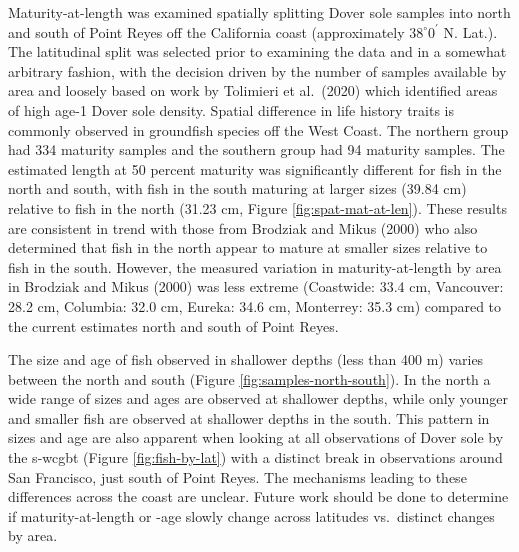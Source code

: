 \documentclass[11pt,
  english,
  a4paper,
]{article}
\begin{document}

Maturity-at-length was examined spatially splitting Dover sole samples into north and south of Point Reyes off the California coast (approximately {\(38^\circ 0^\prime\)\leavevmode\tagmcend\tagstructend} N. Lat.). The latitudinal split was selected prior to examining the data and in a somewhat arbitrary fashion, with the decision driven by the number of samples available by area and loosely based on work by Tolimieri et al.~{(2020)\leavevmode\tagmcend\tagstructend} which identified areas of high age-1 Dover sole density. Spatial difference in life history traits is commonly observed in groundfish species off the West Coast. The northern group had 334 maturity samples and the southern group had 94 maturity samples. The estimated length at 50 percent maturity was significantly different for fish in the north and south, with fish in the south maturing at larger sizes (39.84 cm) relative to fish in the north (31.23 cm, Figure \ref{fig:spat-mat-at-len}). These results are consistent in trend with those from Brodziak and Mikus {(2000)\leavevmode\tagmcend\tagstructend} who also determined that fish in the north appear to mature at smaller sizes relative to fish in the south. However, the measured variation in maturity-at-length by area in Brodziak and Mikus {(2000)\leavevmode\tagmcend\tagstructend} was less extreme (Coastwide: 33.4 cm, Vancouver: 28.2 cm, Columbia: 32.0 cm, Eureka: 34.6 cm, Monterrey: 35.3 cm) compared to the current estimates north and south of Point Reyes.

\leavevmode\tagmcend\tagstructend\par


The size and age of fish observed in shallower depths (less than 400 m) varies between the north and south (Figure \ref{fig:samples-north-south}). In the north a wide range of sizes and ages are observed at shallower depths, while only younger and smaller fish are observed at shallower depths in the south. This pattern in sizes and age are also apparent when looking at all observations of Dover sole by the \gls{s-wcgbt} (Figure \ref{fig:fish-by-lat}) with a distinct break in observations around San Francisco, just south of Point Reyes. The mechanisms leading to these differences across the coast are unclear. Future work should be done to determine if maturity-at-length or -age slowly change across latitudes vs.~distinct changes by area.
\end{document}
